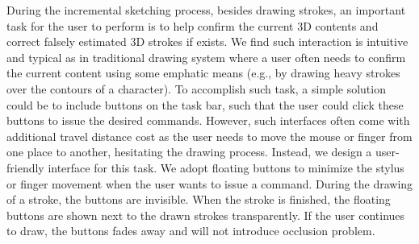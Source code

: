 During the incremental sketching process, besides drawing strokes, an important task for the user to perform is to help confirm the current 3{D} contents and correct falsely estimated 3{D} strokes if exists. We find such interaction is intuitive and typical as in traditional drawing system where a user often needs to confirm the current content using some emphatic means (e.g., by drawing heavy strokes over the contours of a character). To accomplish such task, a simple solution could be to include buttons on the task bar, such that the user could click these buttons to issue the desired commands. However, such interfaces often come with additional travel distance cost as the user needs to move the mouse or finger from one place to another, hesitating the drawing process. Instead, we design a user-friendly interface for this task. We adopt floating buttons to minimize the stylus or finger movement when the user wants to issue a command. During the drawing of a stroke, the buttons are invisible. When the stroke is finished, the floating buttons are shown next to the drawn strokes transparently. If the user continues to draw, the buttons fades away and will not introduce occlusion problem.














